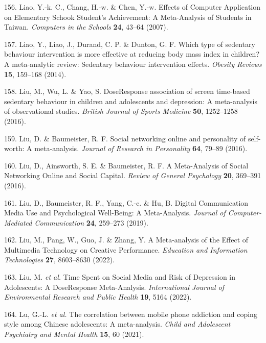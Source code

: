 \documentclass[
  english,
  man]{apa6}
\newenvironment{cslreferences}%
  {}%
  {\par}
\begin{document}
\begin{cslreferences}
\leavevmode\hypertarget{ref-liaoEffectsComputerApplications2007}{}%
156. Liao, Y.-k. C., Chang, H.-w. \& Chen, Y.-w. Effects of Computer Application on Elementary Schook Student's Achievement: A Meta-Analysis of Students in Taiwan. \emph{Computers in the Schools} \textbf{24}, 43--64 (2007).

\leavevmode\hypertarget{ref-liaoWhichTypeSedentary2014}{}%
157. Liao, Y., Liao, J., Durand, C. P. \& Dunton, G. F. Which type of sedentary behaviour intervention is more effective at reducing body mass index in children? A meta-analytic review: Sedentary behaviour intervention effects. \emph{Obesity Reviews} \textbf{15}, 159--168 (2014).

\leavevmode\hypertarget{ref-liuDoseResponseAssociation2016}{}%
158. Liu, M., Wu, L. \& Yao, S. DoseResponse association of screen time-based sedentary behaviour in children and adolescents and depression: A meta-analysis of observational studies. \emph{British Journal of Sports Medicine} \textbf{50}, 1252--1258 (2016).

\leavevmode\hypertarget{ref-liuSocialNetworkingOnline2016}{}%
159. Liu, D. \& Baumeister, R. F. Social networking online and personality of self-worth: A meta-analysis. \emph{Journal of Research in Personality} \textbf{64}, 79--89 (2016).

\leavevmode\hypertarget{ref-liuMetaanalysisSocialNetworking2016}{}%
160. Liu, D., Ainsworth, S. E. \& Baumeister, R. F. A Meta-Analysis of Social Networking Online and Social Capital. \emph{Review of General Psychology} \textbf{20}, 369--391 (2016).

\leavevmode\hypertarget{ref-liuDigitalCommunicationMedia2019}{}%
161. Liu, D., Baumeister, R. F., Yang, C.-c. \& Hu, B. Digital Communication Media Use and Psychological Well-Being: A Meta-Analysis. \emph{Journal of Computer-Mediated Communication} \textbf{24}, 259--273 (2019).

\leavevmode\hypertarget{ref-liuMetaanalysisEffectMultimedia2022}{}%
162. Liu, M., Pang, W., Guo, J. \& Zhang, Y. A Meta-analysis of the Effect of Multimedia Technology on Creative Performance. \emph{Education and Information Technologies} \textbf{27}, 8603--8630 (2022).

\leavevmode\hypertarget{ref-liuTimeSpentSocial2022}{}%
163. Liu, M. \emph{et al.} Time Spent on Social Media and Risk of Depression in Adolescents: A DoseResponse Meta-Analysis. \emph{International Journal of Environmental Research and Public Health} \textbf{19}, 5164 (2022).

\leavevmode\hypertarget{ref-luCorrelationMobilePhone2021}{}%
164. Lu, G.-L. \emph{et al.} The correlation between mobile phone addiction and coping style among Chinese adolescents: A meta-analysis. \emph{Child and Adolescent Psychiatry and Mental Health} \textbf{15}, 60 (2021).


\end{cslreferences}
\end{document}
